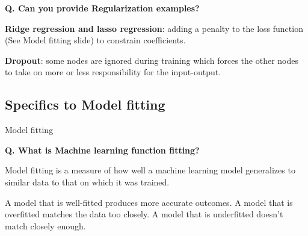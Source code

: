 \begin{frame}[fragile]{\textbf{Q. Can you provide Regularization examples?}}
  \begin{wideitemize}
    \item \textbf{Ridge regression and lasso regression}: adding a penalty
    to the loss function (See Model fitting slide) to constrain coefficients.
    \item \textbf{Dropout}: some nodes are ignored during training which
    forces the other nodes to take on more or less responsibility for the
    input-output.
  \end{wideitemize}
\end{frame}

\subsection{Specifics to Model fitting}
\begin{transitionsubframe}
  \begin{center}
    \Huge Model fitting
  \end{center}
\end{transitionsubframe}

\begin{frame}[fragile]{\textbf{Q. What is Machine learning function fitting?}}
  \begin{wideitemize}
    \item Model fitting is a measure of how well a machine learning model
    generalizes to similar data to that on which it was trained.
    \item A model that is well-fitted produces more accurate outcomes. A model
    that is overfitted matches the data too closely. A model that is underfitted
    doesn't match closely enough.
  \end{wideitemize}
\end{frame}


